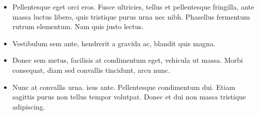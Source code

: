 \documentclass[a0,landscape]{a0poster}
\begin{document}
\begin{multicols}{4}
\begin{itemize}
\item Pellentesque eget orci eros. Fusce ultricies, tellus et pellentesque fringilla, ante massa luctus libero, quis tristique purus urna nec nibh. Phasellus fermentum rutrum elementum. Nam quis justo lectus.
\item Vestibulum sem ante, hendrerit a gravida ac, blandit quis magna.
\item Donec sem metus, facilisis at condimentum eget, vehicula ut massa. Morbi consequat, diam sed convallis tincidunt, arcu nunc.
\item Nunc at convallis urna. isus ante. Pellentesque condimentum dui. Etiam sagittis purus non tellus tempor volutpat. Donec et dui non massa tristique adipiscing.
\end{itemize}









\end{multicols}
\end{document}
